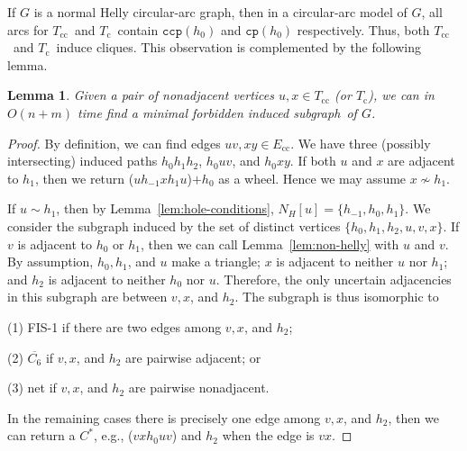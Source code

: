\documentclass[10pt]{article}
\newtheorem{lemma}[theorem]{Lemma}
\newcommand{\badgraph}{minimal forbidden induced subgraph}
\newcommand{\nhcag}{normal Helly circular-arc graph}
\newcommand{\ce}[1]{\ensuremath{{\mathtt{cp}(#1)}}}
\newcommand{\cce}[1]{\ensuremath{{\mathtt{ccp}(#1)}}}
\newcommand{\ecc}{\ensuremath{E_{\text{cc}}}}
\newcommand{\oc}{\ensuremath{T_{\text{c}}}}
\newcommand{\occ}{\ensuremath{T_{\text{cc}}}}
\begin{document}
If $G$ is a \nhcag, then in a circular-arc model of $G$, all arcs for
\occ\ and \oc\ contain $\cce{h_0}$ and $\ce{h_0}$ respectively.  Thus,
both \occ\ and \oc\ induce cliques.  This observation is complemented
by the following lemma.
\begin{lemma}\label{lem:O}
  Given a pair of nonadjacent vertices $u,x\in \occ$ (or \oc), we can
  in $O(n+m)$ time find a \badgraph\ of $G$.
\end{lemma}
\begin{proof}
  By definition, we can find edges $u v,x y\in \ecc$.  We have three
  (possibly intersecting) induced paths $h_0 h_1 h_2$, $h_0 u v$, and
  $h_0 x y$.  If both $u$ and $x$ are adjacent to $h_1$, then we
  return ($u h_{-1} x h_1 u$)$+h_0$ as a wheel.  Hence we may assume
  $x\not\sim h_1$.

  If $u\sim h_1$, then by Lemma~\ref{lem:hole-conditions}, $N_H[u] =
  \{h_{-1}, h_0, h_1\}$.  We consider the subgraph induced by the set
  of distinct vertices $\{h_0, h_1, h_2, u, v, x\}$.  If $v$ is
  adjacent to $h_0$ or $h_1$, then we can call
  Lemma~\ref{lem:non-helly} with $u$ and $v$.  By assumption, $h_0,
  h_1$, and $u$ make a triangle; $x$ is adjacent to neither $u$ nor
  $h_1$; and $h_2$ is adjacent to neither $h_0$ nor $u$.  Therefore,
  the only uncertain adjacencies in this subgraph are between $v, x$,
  and $h_2$.  The subgraph is thus isomorphic to
  \begin{inparaitem}
  \item[(1)] FIS-1 if there are two edges among $v, x$, and $h_2$;
  \item[(2)] $\overline{C_6}$ if $v, x$, and $h_2$ are pairwise
    adjacent; or
  \item[(3)] net if $v, x$, and $h_2$ are pairwise nonadjacent.
  \end{inparaitem}
  In the remaining cases there is precisely one edge among $v, x$, and
  $h_2$, then we can return a $C^*$, e.g., ($v x h_0 u v$) and $h_2$
  when the edge is $vx$.


\end{proof}
\end{document}
